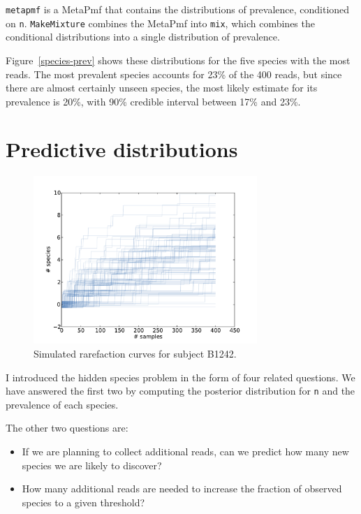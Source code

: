 \documentclass[12pt]{book}
\begin{document}
{\tt metapmf} is a MetaPmf that contains the distributions
of prevalence, conditioned on {\tt n}.  {\tt MakeMixture}
combines the MetaPmf into {\tt mix}, which combines the
conditional distributions into a single distribution
of prevalence.

Figure~\ref{species-prev} shows these distributions for the five
species with the most reads.  The most prevalent species accounts for
23\% of the 400 reads, but since there are almost certainly unseen
species, the most likely estimate for its prevalence is 20\%,
with 90\% credible interval between 17\% and 23\%.


\section{Predictive distributions}

\begin{figure}
\centerline{\includegraphics[height=2.5in]{figs/species-rare-B1242.pdf}}
\caption{Simulated rarefaction curves for subject B1242.}
\label{species-rare}
\end{figure}

I introduced the hidden species problem in the form of four related
questions.  We have answered the first two by computing the posterior
distribution for {\tt n} and the prevalence of each species.

The other two questions are:

\begin{itemize}

\item If we are planning to collect additional reads, can we predict
  how many new species we are likely to discover?

\item How many additional reads are needed to increase the
  fraction of observed species to a given threshold?

\end{itemize}
\end{document}
